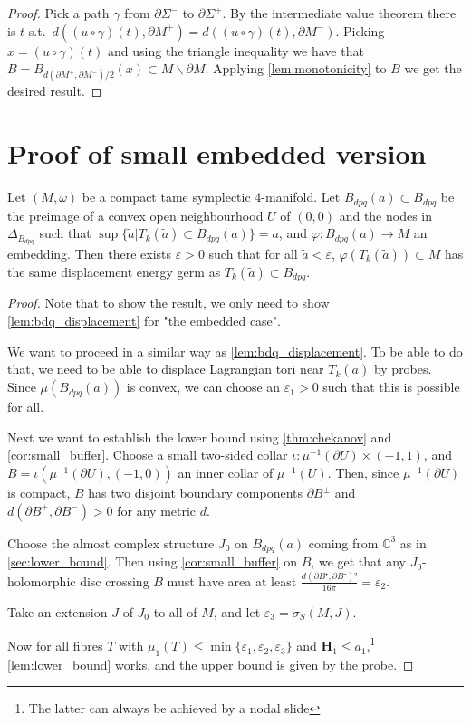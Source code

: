 \documentclass[12pt,a4paper,draft]{scrartcl}
\begin{document}
\begin{proof}
  Pick a path $γ$ from $∂Σ^-$ to $∂Σ^+$. By the intermediate value theorem there is $t$ s.t.\ $d((u ∘ γ) (t),∂M^+) = d((u ∘ γ)(t), ∂M^-)$. Picking $x = (u ∘ γ)(t)$ and using the triangle inequality we have that $B = B_{d(∂M^+,∂M^-)/2}(x) ⊂ M ∖ ∂M $. Applying \cref{lem:monotonicity} to $B$ we get the desired result.
\end{proof}

\section{Proof of small embedded version}


\begin{theorem}
  Let $(M,ω)$ be a compact tame symplectic 4-manifold. Let $B_{dpq}(a) ⊂ B_{dpq}$ be the preimage of a convex open neighbourhood $U$ of $(0,0)$ and the nodes in $Δ_{B_{dpq}}$ such that $\sup\{\tilde{a} | T_k(\tilde{a}) ⊂ B_{dpq}(a)\} = a$, and $φ \colon B_{dpq}(a) → M$ an embedding. Then there exists $ε>0$ such that for all $\tilde{a}<ε$, $φ(T_k(\tilde{a})) ⊂ M$ has the same displacement energy germ as $T_k(\tilde{a}) ⊂ B_{dpq}$.
\end{theorem}

\begin{proof}
  Note that to show the result, we only need to show \cref{lem:bdq_displacement} for "the embedded case".

  We want to proceed in a similar way as \cref{lem:bdq_displacement}. To be able to do that, we need to be able to displace Lagrangian tori near $T_k(\tilde{a})$ by probes. Since $μ(B_{dpq}(a))$ is convex, we can choose an $ε_1>0$ such that this is possible for all.

  Next we want to establish the lower bound using \cref{thm:chekanov} and \cref{cor:small_buffer}. Choose a small two-sided collar $ι \colon μ^{-1}(∂U) × (-1,1)$, and $B = ι(μ^{-1}(∂U), (-1,0))$ an inner collar of $μ^{-1}(U)$.
  Then, since $μ^{-1}(∂U)$ is compact, $B$ has two disjoint boundary components $∂B^±$ and $d(∂B^+,∂B^-) > 0$ for any metric $d$.

  Choose the almost complex structure $J_0$ on $B_{dpq}(a)$ coming from $ℂ^3$ as in \cref{sec:lower_bound}. Then using \cref{cor:small_buffer} on $B$, we get that any $J_0$-holomorphic disc crossing $B$ must have area at least $\frac{d(∂B⁺,∂B⁻)²}{16 π} = ε_2$.

  Take an extension $J$ of $J_0$ to all of $M$, and let $ε_3 = σ_S(M,J)$.

  Now for all fibres $T$ with $μ_1(T) ≤ \min\{ε_1,ε_2,ε_3\}$ and $\symbf{H}_1 ≤ a_1$,\footnote{The latter can always be achieved by a nodal slide} \cref{lem:lower_bound} works, and the upper bound is given by the probe.
\end{proof}
\end{document}
